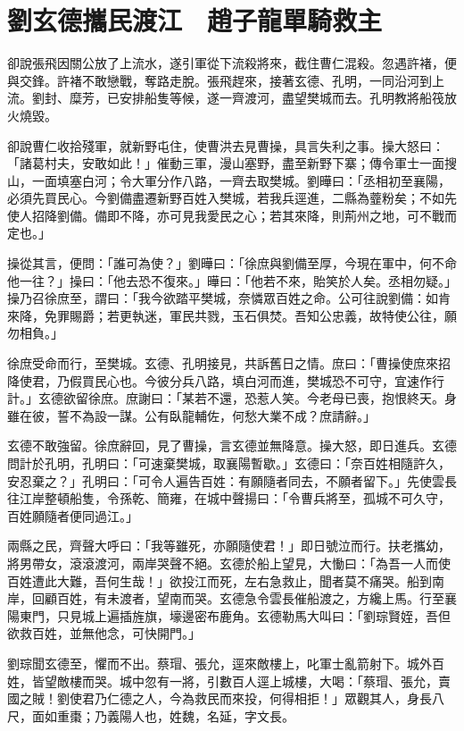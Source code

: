 
\chapter{劉玄德攜民渡江　趙子龍單騎救主}

卻說張飛因關公放了上流水，遂引軍從下流殺將來，截住曹仁混殺。忽遇許褚，便與交鋒。許褚不敢戀戰，奪路走脫。張飛趕來，接著玄德、孔明，一同沿河到上流。劉封、糜芳，已安排船隻等候，遂一齊渡河，盡望樊城而去。孔明教將船筏放火燒毀。

卻說曹仁收拾殘軍，就新野屯住，使曹洪去見曹操，具言失利之事。操大怒曰：「諸葛村夫，安敢如此！」催動三軍，漫山塞野，盡至新野下寨；傳令軍士一面搜山，一面填塞白河；令大軍分作八路，一齊去取樊城。劉曄曰：「丞相初至襄陽，必須先買民心。今劉備盡遷新野百姓入樊城，若我兵逕進，二縣為虀粉矣；不如先使人招降劉備。備即不降，亦可見我愛民之心；若其來降，則荊州之地，可不戰而定也。」

操從其言，便問：「誰可為使？」劉曄曰：「徐庶與劉備至厚，今現在軍中，何不命他一往？」操曰：「他去恐不復來。」曄曰：「他若不來，貽笑於人矣。丞相勿疑。」操乃召徐庶至，謂曰：「我今欲踏平樊城，奈憐眾百姓之命。公可往說劉備：如肯來降，免罪賜爵；若更執迷，軍民共戮，玉石俱焚。吾知公忠義，故特使公往，願勿相負。」

徐庶受命而行，至樊城。玄德、孔明接見，共訴舊日之情。庶曰：「曹操使庶來招降使君，乃假買民心也。今彼分兵八路，填白河而進，樊城恐不可守，宜速作行計。」玄德欲留徐庶。庶謝曰：「某若不還，恐惹人笑。今老母已喪，抱恨終天。身雖在彼，誓不為設一謀。公有臥龍輔佐，何愁大業不成？庶請辭。」

玄德不敢強留。徐庶辭回，見了曹操，言玄德並無降意。操大怒，即日進兵。玄德問計於孔明，孔明曰：「可速棄樊城，取襄陽暫歇。」玄德曰：「奈百姓相隨許久，安忍棄之？」孔明曰：「可令人遍告百姓：有願隨者同去，不願者留下。」先使雲長往江岸整頓船隻，令孫乾、簡雍，在城中聲揚曰：「令曹兵將至，孤城不可久守，百姓願隨者便同過江。」

兩縣之民，齊聲大呼曰：「我等雖死，亦願隨使君！」即日號泣而行。扶老攜幼，將男帶女，滾滾渡河，兩岸哭聲不絕。玄德於船上望見，大慟曰：「為吾一人而使百姓遭此大難，吾何生哉！」欲投江而死，左右急救止，聞者莫不痛哭。船到南岸，回顧百姓，有未渡者，望南而哭。玄德急令雲長催船渡之，方纔上馬。行至襄陽東門，只見城上遍插旌旗，壕邊密布鹿角。玄德勒馬大叫曰：「劉琮賢姪，吾但欲救百姓，並無他念，可快開門。」

劉琮聞玄德至，懼而不出。蔡瑁、張允，逕來敵樓上，叱軍士亂箭射下。城外百姓，皆望敵樓而哭。城中忽有一將，引數百人逕上城樓，大喝：「蔡瑁、張允，賣國之賊！劉使君乃仁德之人，今為救民而來投，何得相拒！」眾觀其人，身長八尺，面如重棗；乃義陽人也，姓魏，名延，字文長。

